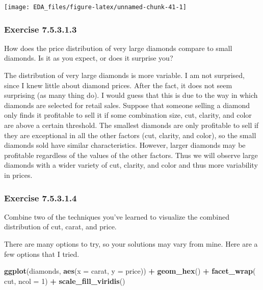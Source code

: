 \documentclass[]{book}
\newenvironment{Shaded}{\begin{snugshade}}{\end{snugshade}}
\newcommand{\DataTypeTok}[1]{\textcolor[rgb]{0.13,0.29,0.53}{#1}}
\newcommand{\DecValTok}[1]{\textcolor[rgb]{0.00,0.00,0.81}{#1}}
\newcommand{\KeywordTok}[1]{\textcolor[rgb]{0.13,0.29,0.53}{\textbf{#1}}}
\newcommand{\NormalTok}[1]{#1}
\newcommand{\OperatorTok}[1]{\textcolor[rgb]{0.81,0.36,0.00}{\textbf{#1}}}
\newcommand{\StringTok}[1]{\textcolor[rgb]{0.31,0.60,0.02}{#1}}
\theoremstyle{plain}
\theoremstyle{remark}
\begin{document}
\begin{center}\texttt{[image: EDA\_files/figure-latex/unnamed-chunk-41-1]} \end{center}

\hypertarget{exercise-7.5.3.1.3}{%
\subsubsection*{\texorpdfstring{Exercise
{7.5.3.1.3}}{Exercise 7.5.3.1.3}}\label{exercise-7.5.3.1.3}}

How does the price distribution of very large diamonds compare to small
diamonds. Is it as you expect, or does it surprise you?

The distribution of very large diamonds is more variable. I am not
surprised, since I knew little about diamond prices. After the fact, it
does not seem surprising (as many thing do). I would guess that this is
due to the way in which diamonds are selected for retail sales. Suppose
that someone selling a diamond only finds it profitable to sell it if
some combination size, cut, clarity, and color are above a certain
threshold. The smallest diamonds are only profitable to sell if they are
exceptional in all the other factors (cut, clarity, and color), so the
small diamonds sold have similar characteristics. However, larger
diamonds may be profitable regardless of the values of the other
factors. Thus we will observe large diamonds with a wider variety of
cut, clarity, and color and thus more variability in prices.

\hypertarget{exercise-7.5.3.1.4}{%
\subsubsection*{\texorpdfstring{Exercise
{7.5.3.1.4}}{Exercise 7.5.3.1.4}}\label{exercise-7.5.3.1.4}}

Combine two of the techniques you've learned to visualize the combined
distribution of cut, carat, and price.

There are many options to try, so your solutions may vary from mine.
Here are a few options that I tried.

\begin{Shaded}
\begin{Highlighting}[]
\KeywordTok{ggplot}\NormalTok{(diamonds, }\KeywordTok{aes}\NormalTok{(}\DataTypeTok{x =}\NormalTok{ carat, }\DataTypeTok{y =}\NormalTok{ price)) }\OperatorTok{+}
\StringTok{  }\KeywordTok{geom_hex}\NormalTok{() }\OperatorTok{+}
\StringTok{  }\KeywordTok{facet_wrap}\NormalTok{(}\OperatorTok{~}\StringTok{ }\NormalTok{cut, }\DataTypeTok{ncol =} \DecValTok{1}\NormalTok{) }\OperatorTok{+}
\StringTok{  }\KeywordTok{scale_fill_viridis}\NormalTok{()}
\end{Highlighting}
\end{Shaded}
\end{document}
